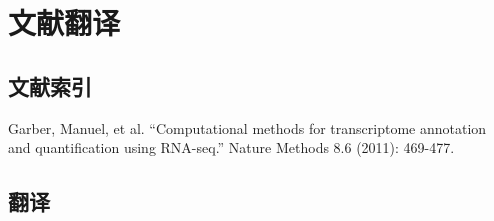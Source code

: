 \chapter{文献翻译}

\section{文献索引}
Garber, Manuel, et al. ``Computational methods for transcriptome annotation and quantification using RNA-seq.'' Nature Methods 8.6 (2011): 469-477.

\section{翻译}


